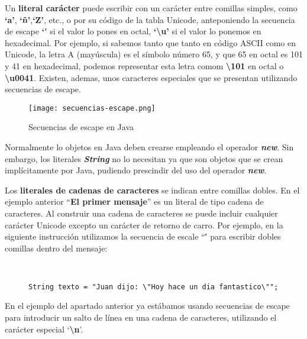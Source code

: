 Un \textbf{literal carácter} puede escribir con un carácter entre comillas simples, como \textbf{`a'}, \textbf{`ñ'},\textbf{`Z'}, etc., o por su código de la tabla Unicode, anteponiendo la secuencia de escape \textbf{`\'} si el valor lo pones en octal, \textbf{`\textbackslash u'} si el valor lo ponemos en hexadecimal. Por ejemplo, si sabemos tanto que tanto en código ASCII como en Unicode, la letra A (mayúscula) es el símbolo número 65, y que 65 en octal es 101 y 41 en hexadecimal, podemos representar esta letra comom \textbf{\textbackslash 101} en octal o \textbf{\textbackslash u0041}. Existen, ademas, unos caracteres especiales que se presentan utilizando secuencias de escape.

    \begin{figure}[H]
    \centering
    \texttt{[image: secuencias-escape.png]}
    \caption{Secuencias de escape en Java}
\end{figure}

Normalmente lo objetos en Java deben crearse empleando el operador \textbf{\textit{new}}. Sin embargo, los literales \textbf{\textit{String}} no lo necesitan ya que son objetos que se crean implícitamente	por Java, pudiendo prescindir del uso del operador \textbf{\textit{new}}.

Los \textbf{literales de cadenas de caracteres} se indican entre comillas dobles. En el ejemplo anterior ``\textbf{El primer mensaje}'' es un literal de tipo cadena de caracteres. Al construir una cadena de caracteres se puede incluir cualquier carácter Unicode excepto un carácter de retorno de carro. Por ejemplo, en la siguiente instrucción utilizamos la secuencia de escale ``\'' para escribir dobles comillas dentro del mensaje:

\begin{figure}[H]
    \begin{tcolorbox}[sharp corners, colback=yellow!30, colframe=white!20]
        \scriptsize
        \begin{verbatim}


String texto = "Juan dijo: \"Hoy hace un dia fantastico\"";
        \end{verbatim}
    \end{tcolorbox}
\end{figure}

En el ejemplo del apartado anterior ya estábamos usando secuencias de escape para introducir un salto de línea en una cadena de caracteres, utilizando el carácter especial `\textbf{\textbackslash n}'.

